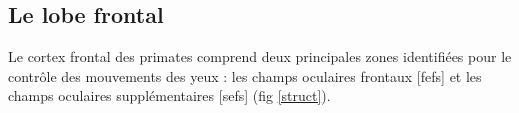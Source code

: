 
\subsection{Le lobe frontal}

Le cortex frontal des primates comprend deux principales zones identifiées pour le contrôle des mouvements des yeux \cite{Schall:1997, Tehovnik:2000}: les champs oculaires frontaux [\glspl{fef}] et les champs oculaires supplémentaires [\glspl{sef}] (fig \ref{struct}).\\

